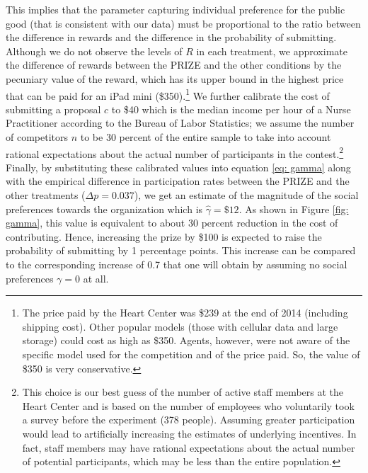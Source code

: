 \documentclass[12pt, titlepage]{article}
\begin{document}
This implies that the parameter capturing individual preference for the
public good (that is consistent with our data) must be proportional to
the ratio between the difference in rewards and the difference in the
probability of submitting. Although we do not observe the levels of
\(R\) in each treatment, we approximate the difference of rewards
between the PRIZE and the other conditions by the pecuniary value of the
reward, which has its upper bound in the highest price that can be paid
for an iPad mini (\$350).\footnote{The price paid by the Heart Center
  was \$239 at the end of 2014 (including shipping cost). Other popular
  models (those with cellular data and large storage) could cost as high
  as \$350. Agents, however, were not aware of the specific model used
  for the competition and of the price paid. So, the value of \$350 is
  very conservative.} We further calibrate the cost of submitting a
proposal \(c\) to \$40 which is the median income per hour of a Nurse
Practitioner according to the Bureau of Labor Statistics; we assume the
number of competitors \(n\) to be 30 percent of the entire sample to
take into account rational expectations about the actual number of
participants in the contest.\footnote{This choice is our best guess of
  the number of active staff members at the Heart Center and is based on
  the number of employees who voluntarily took a survey before the
  experiment (378 people). Assuming greater participation would lead to
  artificially increasing the estimates of underlying incentives. In
  fact, staff members may have rational expectations about the actual
  number of potential participants, which may be less than the entire
  population.} Finally, by substituting these calibrated values into
equation \eqref{eq: gamma} along with the empirical difference in
participation rates between the PRIZE and the other treatments
(\(\Delta p=0.037\)), we get an estimate of the magnitude of the social
preferences towards the organization which is \(\hat\gamma=\$12\). As
shown in Figure \ref{fig: gamma}, this value is equivalent to about 30
percent reduction in the cost of contributing. Hence, increasing the
prize by \$100 is expected to raise the probability of submitting by 1
percentage points. This increase can be compared to the corresponding
increase of 0.7 that one will obtain by assuming no social preferences
\(\gamma=0\) at all.
\end{document}
